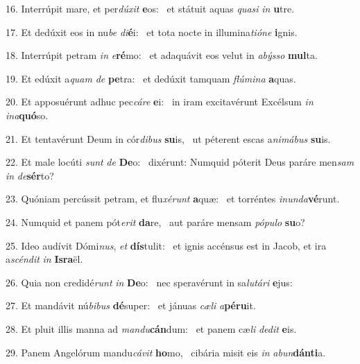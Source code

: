 16. Interrúpit mare, et per\textit{dú}\textit{xit} \textbf{e}os: \ast\  et státuit aquas \textit{qua}\textit{si} \textit{in} \textbf{u}tre.\

17. Et dedúxit eos in nu\textit{be} \textit{di}\textbf{é}i: \ast\  et tota nocte in illumina\textit{ti}\textit{ó}\textit{ne} \textbf{i}gnis.\

18. Interrúpit petram \textit{in} \textit{e}\textbf{ré}mo: \ast\  et adaquávit eos velut in \textit{a}\textit{býs}\textit{so} \textbf{mul}ta.\

19. Et edúxit a\textit{quam} \textit{de} \textbf{pe}tra: \ast\  et dedúxit tamquam \textit{flú}\textit{mi}\textit{na} \textbf{a}quas.\

20. Et apposuérunt adhuc pec\textit{cá}\textit{re} \textbf{e}i: \ast\  in iram excitavérunt Excélsum \textit{in} \textit{in}\textit{a}\textbf{quó}so.\

21. Et tentavérunt Deum in cór\textit{di}\textit{bus} \textbf{su}is, \ast\  ut péterent escas a\textit{ni}\textit{má}\textit{bus} \textbf{su}is.\

22. Et male locúti \textit{sunt} \textit{de} \textbf{De}o: \ast\  dixérunt: Numquid póterit Deus paráre men\textit{sam} \textit{in} \textit{de}\textbf{sér}to?\

23. Quóniam percússit petram, et flu\textit{xé}\textit{runt} \textbf{a}quæ: \ast\  et torréntes \textit{in}\textit{un}\textit{da}\textbf{vé}runt.\

24. Numquid et panem pót\textit{e}\textit{rit} \textbf{da}re, \ast\  aut paráre mensam \textit{pó}\textit{pu}\textit{lo} \textbf{su}o?\

25. Ideo audívit Dómi\textit{nus}, \textit{et} \textbf{dís}tulit: \ast\  et ignis accénsus est in Jacob, et ira a\textit{scén}\textit{dit} \textit{in} \textbf{Is}\textbf{ra}ël.\

26. Quia non credidé\textit{runt} \textit{in} \textbf{De}o: \ast\  nec speravérunt in sa\textit{lu}\textit{tá}\textit{ri} \textbf{e}jus:\

27. Et mandávit nú\textit{bi}\textit{bus} \textbf{dé}super: \ast\  et jánuas \textit{cæ}\textit{li} \textit{a}\textbf{pé}\textbf{ru}it.\

28. Et pluit illis manna ad \textit{man}\textit{du}\textbf{cán}dum: \ast\  et panem cæ\textit{li} \textit{de}\textit{dit} \textbf{e}is.\

29. Panem Angelórum mandu\textit{cá}\textit{vit} \textbf{ho}mo, \ast\  cibária misit eis \textit{in} \textit{ab}\textit{un}\textbf{dán}\textbf{ti}a.\

